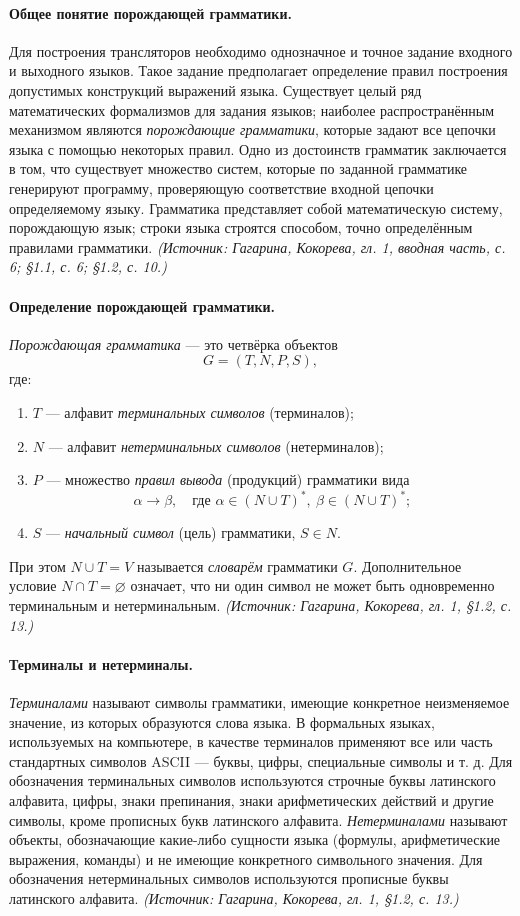 \documentclass[a4paper,12pt]{article}
\begin{document}
\paragraph{Общее понятие порождающей грамматики.}
Для построения трансляторов необходимо однозначное и точное задание входного и выходного языков. Такое задание предполагает определение правил построения допустимых конструкций выражений языка. Существует целый ряд математических формализмов для задания языков; наиболее распространённым механизмом являются \emph{порождающие грамматики}, которые задают все цепочки языка с помощью некоторых правил. Одно из достоинств грамматик заключается в том, что существует множество систем, которые по заданной грамматике генерируют программу, проверяющую соответствие входной цепочки определяемому языку. Грамматика представляет собой математическую систему, порождающую язык; строки языка строятся способом, точно определённым правилами грамматики.
\textit{(Источник: Гагарина, Кокорева, гл. 1, вводная часть, с. 6; §1.1, с. 6; §1.2, с. 10.)}

\paragraph{Определение порождающей грамматики.}
\emph{Порождающая грамматика} — это четвёрка объектов
\[
G=(T,N,P,S),
\]
где:
\begin{enumerate}[label=\arabic*)]
\item \(T\) — алфавит \emph{терминальных символов} (терминалов);
\item \(N\) — алфавит \emph{нетерминальных символов} (нетерминалов);
\item \(P\) — множество \emph{правил вывода} (продукций) грамматики вида
\[
\alpha\to\beta,\quad \text{где } \alpha\in(N\cup T)^*,\ \beta\in(N\cup T)^*;
\]
\item \(S\) — \emph{начальный символ} (цель) грамматики, \(S\in N\).
\end{enumerate}
При этом \(N\cup T=V\) называется \emph{словарём} грамматики \(G\). Дополнительное условие \(N\cap T=\varnothing\) означает, что ни один символ не может быть одновременно терминальным и нетерминальным.
\textit{(Источник: Гагарина, Кокорева, гл. 1, §1.2, с. 13.)}

\paragraph{Терминалы и нетерминалы.}
\emph{Терминалами} называют символы грамматики, имеющие конкретное неизменяемое значение, из которых образуются слова языка. В формальных языках, используемых на компьютере, в качестве терминалов применяют все или часть стандартных символов ASCII — буквы, цифры, специальные символы и т. д. Для обозначения терминальных символов используются строчные буквы латинского алфавита, цифры, знаки препинания, знаки арифметических действий и другие символы, кроме прописных букв латинского алфавита. \emph{Нетерминалами} называют объекты, обозначающие какие-либо сущности языка (формулы, арифметические выражения, команды) и не имеющие конкретного символьного значения. Для обозначения нетерминальных символов используются прописные буквы латинского алфавита.
\textit{(Источник: Гагарина, Кокорева, гл. 1, §1.2, с. 13.)}
\end{document}
